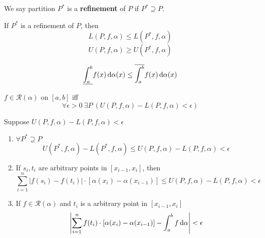     \begin{defi}
        We say partition $P^*$ is a \textbf{refinement} of $P$ if $P^* \supseteq P$.
    \end{defi}

    \begin{theo}
        If $P^*$ is a refinement of $P$, then
        \begin{equation}
            L(P,f,\alpha) \leq L(P^*, f, \alpha)
        \end{equation}
        \begin{equation}
            U(P,f,\alpha) \geq U(P^*, f, \alpha)
        \end{equation}
    \end{theo}

    \begin{theo}
        \begin{equation}
            \underline{\int_a^b} f(x) \mathop{}\!\mathrm{d} \alpha(x) \leq \overline{\int_a^b} f(x) \mathop{}\!\mathrm{d} \alpha(x)
        \end{equation}
    \end{theo}

    \begin{theo}
        $f \in \mathscr{R}(\alpha)$ on $[a,b]$ iff
        \begin{equation}
            \forall \epsilon > 0 \ \exists P \ \left( U(P,f,\alpha)-L(P,f,\alpha) < \epsilon \right)
        \end{equation}
    \end{theo}

    \begin{theo}
        Suppose $U(P,f,\alpha)-L(P,f,\alpha) < \epsilon$
        \begin{enumerate}
            \item $\forall P^* \supseteq P$
            \begin{equation}
                U(P^*,f,\alpha)-L(P^*,f,\alpha) \leq U(P,f,\alpha)-L(P,f,\alpha) < \epsilon
            \end{equation}

            \item If $s_i, t_i$ are arbitrary points in $[x_{i-1}, x_i]$, then
            \begin{equation}
                \sum_{i=1}^n | f(s_i)-f(t_i) | \cdot [\alpha(x_i)-\alpha(x_{i-1})] \leq U(P,f,\alpha)-L(P,f,\alpha) < \epsilon
            \end{equation}

            \item If $f \in \mathscr{R}(\alpha)$ and $t_i$ is a arbitrary point in $[x_{i-1}, x_i]$
            \begin{equation}
                \left| \sum_{i=1}^n f(t_i) \cdot [\alpha(x_i)-\alpha(x_{i-1})] - \int_a^b f \mathop{}\!\mathrm{d} \alpha \right| < \epsilon
            \end{equation}
        \end{enumerate}
    \end{theo}


